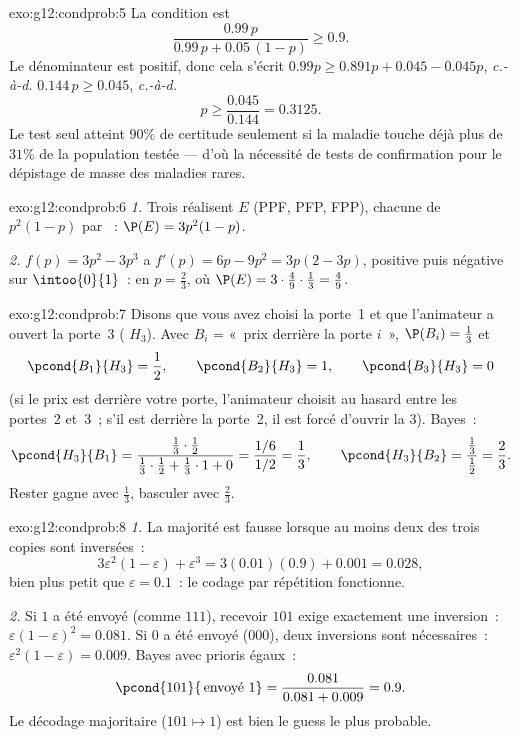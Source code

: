 \begin{solution}{exo:g12:condprob:5}
La condition est
\[
\frac{0.99\,p}{0.99\,p + 0.05\,(1-p)} \geq 0.9 .
\]
Le dénominateur est positif, donc cela s'écrit
$0.99p \geq 0.891p + 0.045 - 0.045p$, \emph{c.-à-d.} $0.144\,p \geq 0.045$,
\emph{c.-à-d.}
\[
p \geq \frac{0.045}{0.144} = 0.3125 .
\]
Le test seul atteint $90\%$ de certitude seulement si la maladie touche
déjà plus de $31\%$ de la population testée --- d'où la nécessité de tests
de confirmation pour le dépistage de masse des maladies rares.
\end{solution}

\begin{solution}{exo:g12:condprob:6}
\emph{1.} Trois  réalisent $E$ (PPF, PFP, FPP), chacune de
 $p^2(1-p)$ par ~: $\P(E) = 3p^2(1 - p)$.

\emph{2.} $f(p) = 3p^2 - 3p^3$ a $f'(p) = 6p - 9p^2 = 3p(2 - 3p)$,
positive puis négative sur $\intoo{0}{1}$~:  en $p = \frac23$, où
$\P(E) = 3\cdot\frac49\cdot\frac13 = \frac49$.
\end{solution}

\begin{solution}{exo:g12:condprob:7}
Disons que vous avez choisi la porte~1 et que l'animateur a ouvert la
porte~3 ( $H_3$). Avec $B_i$ = «~prix derrière la porte $i$~»,
$\P(B_i) = \frac13$ et
\[
\pcond{B_1}{H_3} = \frac12, \qquad
\pcond{B_2}{H_3} = 1, \qquad
\pcond{B_3}{H_3} = 0
\]
(si le prix est derrière votre porte, l'animateur choisit au hasard entre
les portes~2 et~3~; s'il est derrière la porte~2, il est forcé d'ouvrir la
$3$). Bayes~:
\[
\pcond{H_3}{B_1}
= \frac{\frac13\cdot\frac12}{\frac13\cdot\frac12 + \frac13\cdot1 + 0}
= \frac{1/6}{1/2} = \frac13,
\qquad
\pcond{H_3}{B_2} = \frac{\frac13}{\frac12} = \frac23 .
\]
Rester gagne avec  $\frac13$, basculer avec 
$\frac23$.
\end{solution}

\begin{solution}{exo:g12:condprob:8}
\emph{1.} La majorité est fausse lorsque au moins deux des trois copies
sont inversées~:
\[
3\varepsilon^2(1-\varepsilon) + \varepsilon^3
= 3(0.01)(0.9) + 0.001 = 0.028,
\]
bien plus petit que $\varepsilon = 0.1$~: le codage par répétition
fonctionne.

\emph{2.} Si $1$ a été envoyé (comme $111$), recevoir $101$ exige
exactement une inversion~: 
$\varepsilon(1-\varepsilon)^2 = 0.081$. Si $0$ a été envoyé ($000$),
deux inversions sont nécessaires~: $\varepsilon^2(1-\varepsilon) = 0.009$.
Bayes avec prioris égaux~:
\[
\pcond{101}{\,\text{envoyé }1} = \frac{0.081}{0.081 + 0.009} = 0.9 .
\]
Le décodage majoritaire ($101 \mapsto 1$) est bien le guess le plus
probable.
\end{solution}

